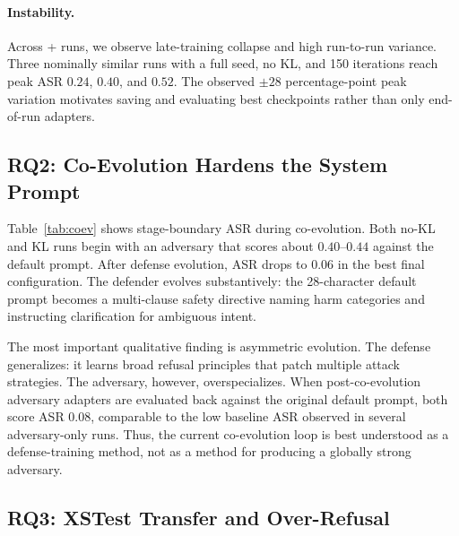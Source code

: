 \paragraph{Instability.}
Across \rloo{}+\lp{} runs, we observe late-training collapse and high run-to-run variance.
Three nominally similar runs with a full seed, no KL, and 150 iterations reach peak ASR $0.24$, $0.40$, and $0.52$.
The observed $\pm 28$ percentage-point peak variation motivates saving and evaluating best checkpoints rather than only end-of-run adapters.
\subsection{RQ2: Co-Evolution Hardens the System Prompt}

Table~\ref{tab:coev} shows stage-boundary ASR during co-evolution.
Both no-KL and KL runs begin with an adversary that scores about $0.40$--$0.44$ against the default prompt.
After defense evolution, ASR drops to $0.06$ in the best final configuration.
The defender evolves substantively: the 28-character default prompt becomes a multi-clause safety directive naming harm categories and instructing clarification for ambiguous intent.
\begin{table}[t]
\centering
\caption{
Co-evolution dynamics. 
Stage values are ASR before that stage's GEPA defense update; ``Final'' is the optimized defense prompt.
}
\label{tab:coev}
\end{table}

The most important qualitative finding is asymmetric evolution.
The defense generalizes: it learns broad refusal principles that patch multiple attack strategies. 
The adversary, however, overspecializes.
When post-co-evolution adversary adapters are evaluated back against the original default prompt, both score ASR $0.08$, comparable to the low baseline ASR observed in several adversary-only runs.
Thus, the current co-evolution loop is best understood as a defense-training method, not as a method for producing a globally strong adversary.
\subsection{RQ3: XSTest Transfer and Over-Refusal}

